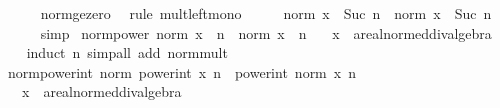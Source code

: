 \begin{isabellebody}
\ \ \ \ \isamarkupfalse%
\ norm{\isacharunderscore}{\kern0pt}ge{\isacharunderscore}{\kern0pt}zero\ \isamarkupfalse%
\ {\isacharparenleft}{\kern0pt}rule\ mult{\isacharunderscore}{\kern0pt}left{\isacharunderscore}{\kern0pt}mono{\isacharparenright}{\kern0pt}\isanewline
\ \ \isamarkupfalse%
\ \isamarkupfalse%
\ {\isachardoublequoteopen}norm\ {\isacharparenleft}{\kern0pt}x\ {\isacharcircum}{\kern0pt}\ Suc\ n{\isacharparenright}{\kern0pt}\ {\isasymle}\ norm\ x\ {\isacharcircum}{\kern0pt}\ Suc\ n{\isachardoublequoteclose}\isanewline
\ \ \ \ \isamarkupfalse%
\ simp\isanewline
{}\isamarkupfalse%
%
\endisatagproof
{\isafoldproof}%
%
\isadelimproof
\isanewline
%
\endisadelimproof
\isanewline
{}\isamarkupfalse%
\ norm{\isacharunderscore}{\kern0pt}power{\isacharcolon}{\kern0pt}\ {\isachardoublequoteopen}norm\ {\isacharparenleft}{\kern0pt}x\ {\isacharcircum}{\kern0pt}\ n{\isacharparenright}{\kern0pt}\ {\isacharequal}{\kern0pt}\ norm\ x\ {\isacharcircum}{\kern0pt}\ n{\isachardoublequoteclose}\isanewline
\ \ \ x\ {\isacharcolon}{\kern0pt}{\isacharcolon}{\kern0pt}\ {\isachardoublequoteopen}{\isacharprime}{\kern0pt}a{\isacharcolon}{\kern0pt}{\isacharcolon}{\kern0pt}real{\isacharunderscore}{\kern0pt}normed{\isacharunderscore}{\kern0pt}div{\isacharunderscore}{\kern0pt}algebra{\isachardoublequoteclose}\isanewline
%
\isadelimproof
\ \ %
\endisadelimproof
%
\isatagproof
{}\isamarkupfalse%
\ {\isacharparenleft}{\kern0pt}induct\ n{\isacharparenright}{\kern0pt}\ {\isacharparenleft}{\kern0pt}simp{\isacharunderscore}{\kern0pt}all\ add{\isacharcolon}{\kern0pt}\ norm{\isacharunderscore}{\kern0pt}mult{\isacharparenright}{\kern0pt}%
\endisatagproof
{\isafoldproof}%
%
\isadelimproof
\isanewline
%
\endisadelimproof
\isanewline
{}\isamarkupfalse%
\ norm{\isacharunderscore}{\kern0pt}power{\isacharunderscore}{\kern0pt}int{\isacharcolon}{\kern0pt}\ {\isachardoublequoteopen}norm\ {\isacharparenleft}{\kern0pt}power{\isacharunderscore}{\kern0pt}int\ x\ n{\isacharparenright}{\kern0pt}\ {\isacharequal}{\kern0pt}\ power{\isacharunderscore}{\kern0pt}int\ {\isacharparenleft}{\kern0pt}norm\ x{\isacharparenright}{\kern0pt}\ n{\isachardoublequoteclose}\isanewline
\ \ \ x\ {\isacharcolon}{\kern0pt}{\isacharcolon}{\kern0pt}\ {\isachardoublequoteopen}{\isacharprime}{\kern0pt}a{\isacharcolon}{\kern0pt}{\isacharcolon}{\kern0pt}real{\isacharunderscore}{\kern0pt}normed{\isacharunderscore}{\kern0pt}div{\isacharunderscore}{\kern0pt}algebra{\isachardoublequoteclose}\isanewline

\end{isabellebody}

